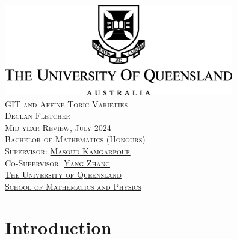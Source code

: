 \documentclass[12pt]{amsart}
\theoremstyle{plain}
\begin{document}

\begin{center}
\includegraphics[width=10cm]{../images/UQLogo.jpg} \\ 
\vspace{3cm}
{\LARGE\textsc{GIT and Affine Toric Varieties}} \\
\vspace{0.5cm}
{\textsc{Declan Fletcher}} \\
\vspace{8cm}
{\textsc{Mid-year Review, July 2024}} \\
{\textsc{ Bachelor of Mathematics (Honours)}} \\
\vspace{1cm}
{\textsc{Supervisor: \href{https://sites.google.com/site/masoudkomi/home}{Masoud Kamgarpour}}} \\
{\textsc{Co-Supervisor: \href{https://sites.google.com/site/yangzhang139/home}{Yang Zhang}}} \\
\vspace{1cm}
{\textsc{\href{https://www.uq.edu.au/}{The University of Queensland}}} \\
{\textsc{\href{https://smp.uq.edu.au/}{School of Mathematics and Physics}}}
\end{center}


\newpage
\tableofcontents


\newpage
{}
\section{Introduction}
\end{document}
